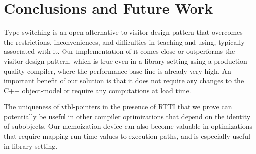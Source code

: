 \section{Conclusions and Future Work} %
\label{sec:cc}

Type switching is an open alternative to visitor design pattern that overcomes 
the restrictions, inconveniences, and difficulties in teaching and using, 
typically associated with it. Our implementation of it comes close or 
outperforms the visitor design pattern, which is true even in a library setting 
using a production-quality compiler, where the performance base-line is 
already very high. An important benefit of our solution is that it does not 
require any changes to the C++ object-model or require any computations at load 
time.

The uniqueness of vtbl-pointers in the presence of RTTI that we prove can 
potentially be useful in other compiler optimizations that depend on the 
identity of subobjects. Our memoization device can also become valuable in 
optimizations that require mapping run-time values to execution paths, 
and is especially useful in library setting.

%
%
%
%
%
